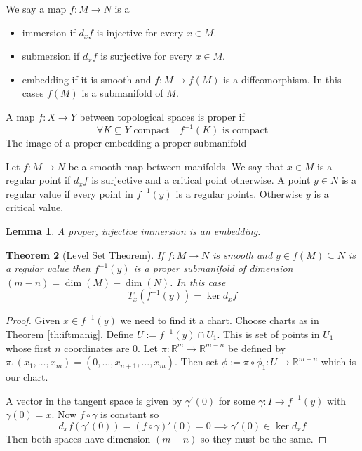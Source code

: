 \documentclass[11pt]{article}
\newcommand{\defeq}{:=}
\newcommand{\R}{\mathbb{R}}
\newenvironment{defin}
	{\begin{mdframed}[backgroundcolor=white, roundcorner=5pt, linewidth=1pt, linecolor=RoyalBlue]
		\setlength{\parindent}{0pt}}
	{\end{mdframed}}
\newcommand{\mdf}[1]{{\color{RoyalBlue} #1}}
\newtheorem{theorem}{Theorem}[section]
\newtheorem{lemma}[theorem]{Lemma}
\begin{document}
\begin{defin}
We say a map $f:M\to N$ is a
\begin{itemize}
	\item \mdf{immersion} if $d_xf$ is injective for every $x\in M$.
	\item \mdf{submersion} if $d_xf$ is surjective for every $x\in M$.
	\item \mdf{embedding} if it is smooth and $f:M \to f(M)$ is a diffeomorphism.
		In this cases $f(M)$ is a \mdf{submanifold} of $M$.
\end{itemize}
A map $f:X \to Y$ between topological spaces is \mdf{proper} if
\[
	\forall K\subseteq Y\text{ compact} \quad f^{-1}(K) \text{ is compact}
\]
The image of a proper embedding a \mdf{proper submanifold}

Let $f:M \to N$ be a smooth map between manifolds.
We say that $x\in M$ is a \mdf{regular point} if $d_x f$ is surjective and a \mdf{critical point} otherwise.
A point $y\in N$ is a \mdf{regular value} if every point in $f^{-1}(y)$ is a regular points.
Otherwise $y$ is a \mdf{critical value}.
\end{defin}

\begin{lemma}
A proper, injective immersion is an embedding.
\end{lemma}

\begin{theorem}[Level Set Theorem]
If $f:M \to N$ is smooth and $y\in f(M)\subseteq N$ is a regular value then $f^{-1}(y)$ is a proper submanifold of dimension $(m-n)=\dim(M)-\dim(N)$.
In this case
\[
	T_x(f^{-1}(y)) = \ker d_xf
\]
\end{theorem}

\begin{proof}
Given $x\in f^{-1}(y)$ we need to find it a chart.
Choose charts as in Theorem \ref{th:iftmanig}.
Define $U\defeq f^{-1}(y) \cap U_1$.
This is set of points in $U_1$ whose first $n$ coordinates are $0$.
Let $\pi:\R^m \to \R^{m-n}$ be defined by $\pi_1(x_1, \dots, x_m) = (0, \dots, x_{n+1}, \dots , x_m)$.
Then set $\phi\defeq \pi\circ\phi_1:U\to\R^{m-n}$ which is our chart.

A vector in the tangent space is given by $\gamma'(0)$ for some $\gamma:I \to f^{-1}(y)$ with $\gamma(0)=x$.
Now $f\circ \gamma$ is constant so
\[
	d_xf(\gamma'(0)) = (f\circ \gamma)'(0) = 0 \implies \gamma'(0) \in \ker d_xf
\]
Then both spaces have dimension $(m-n)$ so they must be the same.
\end{proof}
\end{document}
